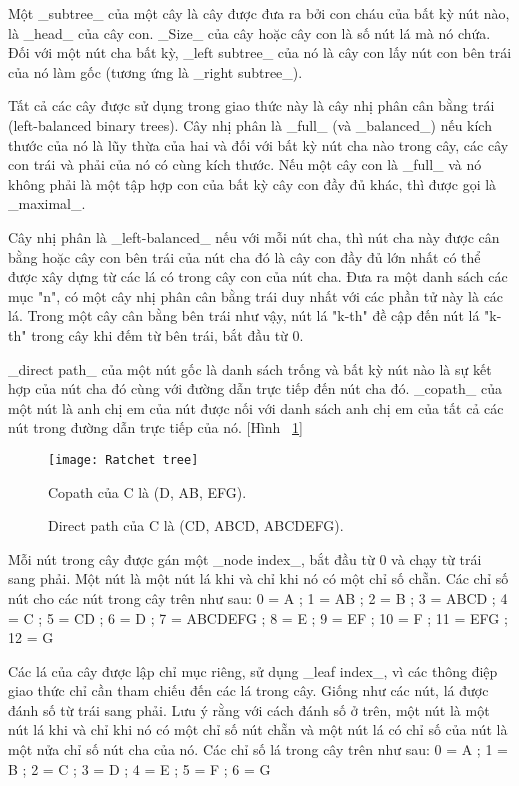 \documentclass[../main-report.tex]{subfiles}
\begin{document}
Một \_subtree\_ của một cây là cây được đưa ra bởi con cháu của bất kỳ nút nào, là \_head\_ của cây con. \_Size\_ của cây hoặc cây con là số nút lá mà nó chứa. Đối với một nút cha bất kỳ, \_left subtree\_ của nó là cây con lấy nút con bên trái của nó làm gốc (tương ứng là \_right subtree\_).

Tất cả các cây được sử dụng trong giao thức này là cây nhị phân cân bằng trái (left-balanced binary trees). Cây nhị phân là \_full\_ (và \_balanced\_) nếu kích thước của nó là lũy thừa của hai và đối với bất kỳ nút cha nào trong cây, các cây con trái và phải của nó có cùng kích thước. Nếu một cây con là \_full\_  và nó không phải là một tập hợp con của bất kỳ cây con đầy đủ khác, thì được gọi là \_maximal\_. 

Cây nhị phân là \_left-balanced\_ nếu với mỗi nút cha, thì nút cha này được cân bằng hoặc cây con bên trái của nút cha đó là cây con đầy đủ lớn nhất có thể được xây dựng từ các lá có trong cây con của nút cha. Đưa ra một danh sách các mục "n", có một cây nhị phân cân bằng trái duy nhất với các phần tử này là các lá. Trong một cây cân bằng bên trái như vậy, nút lá "k-th" đề cập đến nút lá "k-th" trong cây khi đếm từ bên trái, bắt đầu từ 0.

\_direct path\_ của một nút gốc là danh sách trống và bất kỳ nút nào là sự kết hợp của nút cha đó cùng với đường dẫn trực tiếp đến nút cha đó. \_copath\_ của một nút là anh chị em của nút được nối với danh sách anh chị em của tất cả các nút trong đường dẫn trực tiếp của nó. [Hình ~\ref{fig:tree}]

\begin{figure}[!h]
\begin{center}
\label{fig:tree}
\texttt{[image: Ratchet tree]}
\caption{Direct path của C là (CD, ABCD, ABCDEFG).}

{Copath của C là (D, AB, EFG).}
\end{center}
\end{figure}

Mỗi nút trong cây được gán một \_node index\_, bắt đầu từ 0 và chạy từ trái sang phải. Một nút là một nút lá khi và chỉ khi nó có một chỉ số chẵn. Các chỉ số nút cho các nút trong cây trên như sau:
0 = A ; 1 = AB ; 2 = B ; 3 = ABCD ; 4 = C ; 5 = CD ; 6 = D ; 7 = ABCDEFG ; 8 = E ; 9 = EF ; 10 = F ; 11 = EFG ; 12 = G

Các lá của cây được lập chỉ mục riêng, sử dụng \_leaf index\_, vì các thông điệp giao thức chỉ cần tham chiếu đến các lá trong cây. Giống như các nút, lá được đánh số từ trái sang phải. Lưu ý rằng với cách đánh số ở trên, một nút là một nút lá khi và chỉ khi nó có một chỉ số nút chẵn và một nút lá có chỉ số của nút là một nửa chỉ số nút cha của nó. Các chỉ số lá trong cây trên như sau:
0 = A ; 1 = B ; 2 = C ; 3 = D ; 4 = E ; 5 = F ; 6 = G
\end{document}
